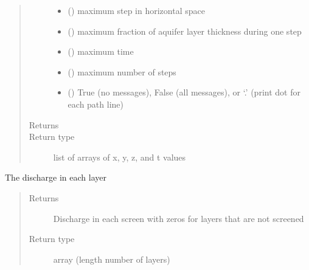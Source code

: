 \documentclass[letterpaper,10pt,english]{sphinxmanual}
\begin{document}
\begin{fulllineitems}
\begin{fulllineitems}
\begin{quote}
\begin{description}
\begin{itemize}
\item {} 
 () \textendash{} maximum step in horizontal space

\item {} 
 () \textendash{} maximum fraction of aquifer layer thickness during one step

\item {} 
 () \textendash{} maximum time

\item {} 
 (\sphinxstyleliteralemphasis{(}\sphinxstyleliteralemphasis{)}) \textendash{} maximum number of steps

\item {} 
 () \textendash{} True (no messages), False (all messages), or ‘.’
(print dot for each path line)

\end{itemize}

\item[{Returns}] \leavevmode
{}

\item[{Return type}] \leavevmode
list of arrays of x, y, z, and t values

\end{description}\end{quote}

\end{fulllineitems}


\begin{fulllineitems}
\label{\detokenize{wells/well:timml.well.Well.discharge}}
The discharge in each layer
\begin{quote}\begin{description}
\item[{Returns}] \leavevmode
Discharge in each screen with zeros for layers that are not
screened

\item[{Return type}] \leavevmode
array (length number of layers)


\end{description}
\end{quote}
\end{fulllineitems}
\end{fulllineitems}
\end{document}
